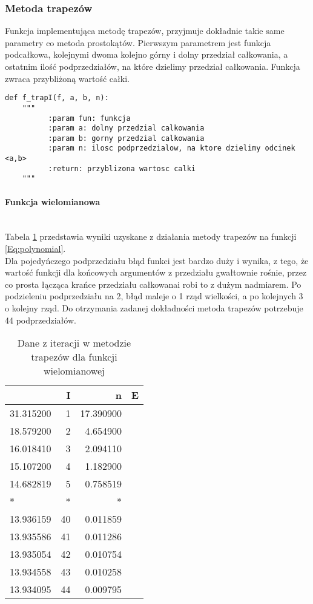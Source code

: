 \documentclass[12pt,twoside]{article}
\begin{document}
\subsubsection{Metoda trapezów}

Funkcja implementująca metodę trapezów, przyjmuje dokładnie takie same parametry co metoda prostokątów. Pierwszym parametrem jest funkcja podcałkowa, kolejnymi dwoma kolejno górny i dolny przedział całkowania, a ostatnim  ilość podprzedziałów, na które dzielimy przedział całkowania. Funkcja zwraca przybliżoną wartość całki.

\begin{lstlisting}[caption={Kod w języku python implementujący metodę trapezów}]
def f_trapI(f, a, b, n):
    """
     	  :param fun: funkcja
          :param a: dolny przedzial calkowania
          :param b: gorny przedzial calkowania
          :param n: ilosc podprzedzialow, na ktore dzielimy odcinek <a,b>
          :return: przyblizona wartosc calki
    """
\end{lstlisting}
\label{Listing 7}

\paragraph{Funkcja wielomianowa}\mbox{} \\

Tabela \ref{tabela2.1} przedstawia wyniki uzyskane z działania metody trapezów na funkcji \eqref{Eq:polynomial}.\\
Dla pojedyńczego podprzedziału błąd funkci jest bardzo duży i wynika, z tego, że wartość funkcji dla końcowych argumentów z przedziału gwałtownie rośnie, przez co prosta łącząca krańce przedziału całkowanai robi to z dużym nadmiarem. Po podzieleniu podprzedziału na 2, błąd maleje o 1 rząd wielkości, a po kolejnych 3 o kolejny rząd. Do otrzymania zadanej dokładności metoda trapezów potrzebuje 44 podprzedziałów.
\begin{table}[ht]
\centering 
\caption{Dane z iteracji w metodzie trapezów dla funkcji wielomianowej}
\label{tabela2.1}
\begin{tabular}{lrrr}
\toprule
{} & I  &  n &       E \\
\midrule
31.315200 &       1 &  17.390900 \\
18.579200 &       2 &   4.654900 \\
16.018410 &       3 &   2.094110 \\
15.107200 &       4 &   1.182900 \\
14.682819 &       5 &   0.758519 \\
* &      * &   * \\
13.936159 &      40 &   0.011859 \\
13.935586 &      41 &   0.011286 \\
13.935054 &      42 &   0.010754 \\
13.934558 &      43 &   0.010258 \\
13.934095 &      44 &   0.009795 \\
\bottomrule
\end{tabular}
\end{table}
\end{document}
